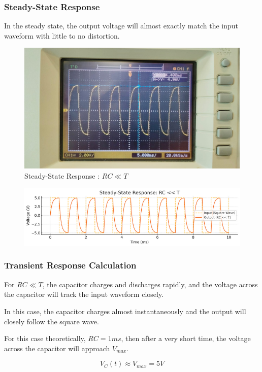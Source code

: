 \documentclass[a4paper,12pt]{article}
\begin{document}
\subsubsection*{Steady-State Response}
In the steady state, the output voltage will almost exactly match the input waveform with little to no distortion.
\begin{figure}[H]
    \centering
    \includegraphics[width=\textwidth]{figs/rc<t.jpeg}
    \caption{Steady-State Response : \( RC \ll T \)}
\end{figure}
\begin{figure}[H]
    \centering
    \includegraphics[width=\textwidth]{figs/rc<t_prog.png}
\end{figure}

\subsubsection*{Transient Response Calculation}
For \( RC \ll T \), the capacitor charges and discharges rapidly, and the voltage across the capacitor will track the input waveform closely.

In this case, the capacitor charges almost instantaneously and the output will closely follow the square wave.

For this case theoretically, \( RC = 1ms \), then after a very short time, the voltage across the capacitor will approach \( V_{max} \). 

\[
V_C\left(t\right) \approx V_{max} = 5V
\]
\end{document}
